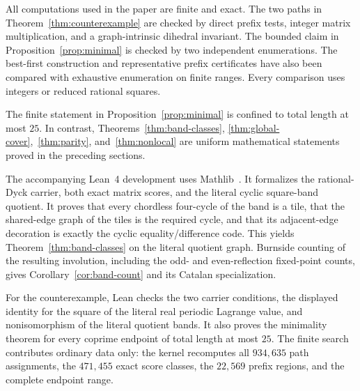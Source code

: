 \documentclass[11pt]{amsart}
\theoremstyle{definition}
\begin{document}
All computations used in the paper are finite and exact.  The two paths in
Theorem~\ref{thm:counterexample} are checked by direct prefix tests, integer
matrix multiplication, and a graph-intrinsic dihedral invariant.  The bounded
claim in Proposition~\ref{prop:minimal} is checked by two independent
enumerations.  The best-first construction and representative prefix
certificates have also been compared with exhaustive enumeration on finite
ranges.  Every comparison uses integers or reduced rational squares.

The finite statement in Proposition~\ref{prop:minimal} is confined to total
length at most $25$.  In contrast, Theorems~\ref{thm:band-classes},
\ref{thm:global-cover},~\ref{thm:parity}, and~\ref{thm:nonlocal} are uniform
mathematical statements proved in the preceding sections.

The accompanying Lean~4 development uses Mathlib~\cite{Lean4,Mathlib}.  It
formalizes the rational-Dyck carrier, both exact matrix scores, and the literal
cyclic square-band quotient.  It proves that every chordless four-cycle of the
band is a tile, that the shared-edge graph of the tiles is the required cycle,
and that its adjacent-edge decoration is exactly the cyclic
equality/difference code.  This yields Theorem~\ref{thm:band-classes} on the
literal quotient graph.  Burnside counting of the resulting involution,
including the odd- and even-reflection fixed-point counts, gives
Corollary~\ref{cor:band-count} and its Catalan specialization.

For the counterexample, Lean checks the two carrier conditions, the displayed
identity for the square of the literal real periodic Lagrange value, and
nonisomorphism of the literal quotient bands.  It also
proves the minimality theorem for every coprime endpoint of total length at
most $25$.  The finite search contributes ordinary data only: the kernel
recomputes all $934{,}635$ path assignments, the $471{,}455$ exact score
classes, the $22{,}569$ prefix regions, and the complete endpoint range.
\end{document}
